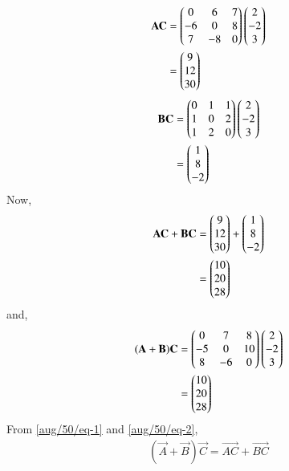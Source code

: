 \begin{align}
    \mathbf{AC}&=\begin{pmatrix}0&6&7\\-6&0&8\\7&-8&0\end{pmatrix}\begin{pmatrix}2\\-2\\3\end{pmatrix}\\
  &=\begin{pmatrix}9\\12\\30\end{pmatrix}
\end{align}
\begin{align}
    \mathbf{BC}&=\begin{pmatrix}0&1&1\\1&0&2\\1&2&0\end{pmatrix}\begin{pmatrix}2\\-2\\3\end{pmatrix}\\
  &=\begin{pmatrix}1\\8\\-2\end{pmatrix}
\end{align}
Now,
\begin{align}
    \mathbf{AC}+\mathbf{BC}&=\begin{pmatrix}9\\12\\30\end{pmatrix}+\begin{pmatrix}1\\8\\-2\end{pmatrix}\\
    &=\begin{pmatrix}10\\20\\28\end{pmatrix} \label{aug/50/eq-2}
\end{align}
and,
\begin{align}
    (\mathbf{A}+\mathbf{B})\mathbf{C}&=\begin{pmatrix}0&7&8\\-5&0&10\\8&-6&0\end{pmatrix}\begin{pmatrix}2\\-2\\3\end{pmatrix}\\
&=\begin{pmatrix}10\\20\\28\end{pmatrix} \label{aug/50/eq-1}
\end{align}
From \eqref{aug/50/eq-1} and \eqref{aug/50/eq-2},
\begin{align}
    (\vec{A}+\vec{B})\vec{C}=\vec{AC}+\vec{BC}
\end{align}